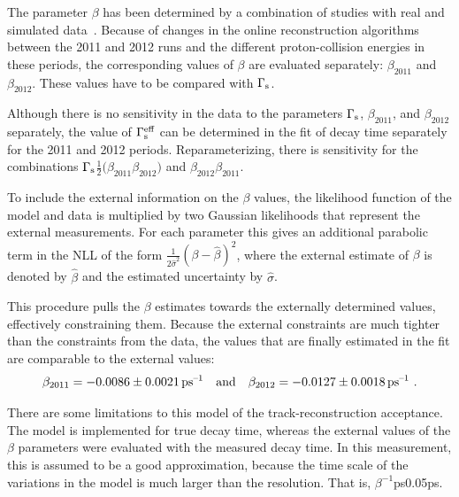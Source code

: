 The parameter $\beta$ has been determined by a combination of studies with real and simulated data~\cite{LHCb-ANA-2014-039}. Because of
changes in the online reconstruction algorithms between the 2011 and 2012 runs and the different proton-collision energies in these
periods, the corresponding values of $\beta$ are evaluated separately: $\beta_\text{2011}$\texteq\mbox{\unitsp\invps}
and $\beta_\text{2012}$\texteq\mbox{\unitsp\invps}. These values have to be compared with
$\Gamma_\text{s}$\unitsp\invps.

Although there is no sensitivity in the \BstoJpsiKK{} data to the parameters $\Gamma_\text{s}$, $\beta_\text{2011}$, and $\beta_\text{2012}$
separately, the value of $\Gamma_\text{s}^\text{eff}$ can be determined in the fit of decay time separately for the 2011 and 2012 periods.
Reparameterizing, there is sensitivity for the combinations $\Gamma_\text{s}$\textminus$\tfrac{1}{2}(\beta_\text{2011}$\textplus$\beta_\text{2012})$
and $\beta_\text{2012}$\textminus$\beta_\text{2011}$.

To include the external information on the $\beta$ values, the likelihood function of the \BstoJpsiKK{} model and data is multiplied by two
Gaussian likelihoods that represent the external measurements. For each parameter this gives an additional parabolic term in the NLL of the
form $\frac{1}{2\hat{\sigma}^2}(\beta-\hat{\beta})^2$, where the external estimate of $\beta$ is denoted by $\hat{\beta}$ and the estimated
uncertainty by $\hat{\sigma}$.

This procedure pulls the $\beta$ estimates towards the externally determined values, effectively constraining them. Because the external
constraints are much tighter than the constraints from the \BstoJpsiKK{} data, the values that are finally estimated in the fit are
comparable to the external values:
\begin{equation*}
  \beta_\text{2011} = -0.0086\pm0.0021\unitsp\text{\invps}
  \quad\text{and}\quad
  \beta_\text{2012} = -0.0127\pm0.0018\unitsp\text{\invps}\ .
\end{equation*}

There are some limitations to this model of the track-reconstruction acceptance. The model is implemented for true decay time, whereas the
external values of the $\beta$ parameters were evaluated with the measured decay time. In this measurement, this is assumed to be a good
approximation, because the time scale of the variations in the model is much larger than the resolution. That is,
$\beta^{-1}$\textapprox\mbox{\unitsp{}ps}\textgg\mbox{0.05\unitsp{}ps}.

